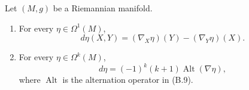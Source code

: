 \begin{proposition}
\label{prop:exterior-derivative-covariant-formula}

Let $(M,g)$ be a Riemannian manifold.
\begin{enumerate}
\item[(a)] For every $\eta\in\Omega^1(M)$,
\[
d\eta(X,Y)=(\nabla_X\eta)(Y)-(\nabla_Y\eta)(X).
\]
\item[(b)] For every $\eta\in\Omega^k(M)$,
\[
d\eta=(-1)^k(k+1)\operatorname{Alt}(\nabla\eta),
\]
where $\operatorname{Alt}$ is the alternation operator in (B.9).
\end{enumerate}
\end{proposition}
